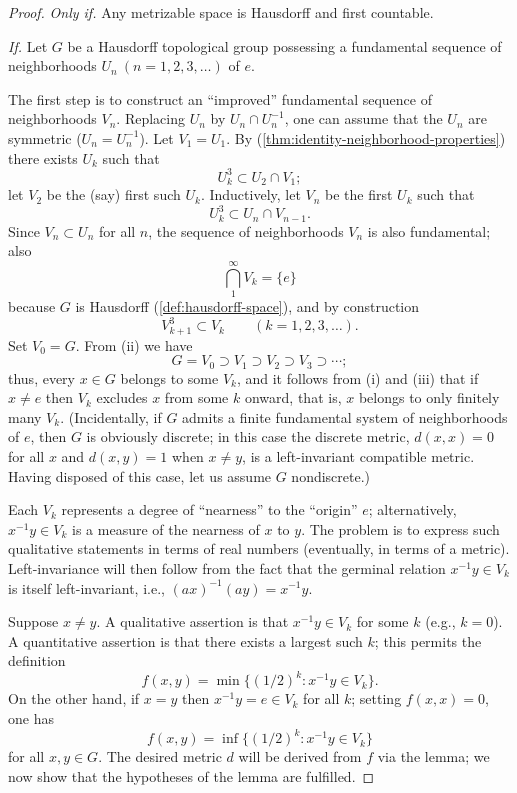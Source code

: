\begin{proof}
    \textit{Only if.} Any metrizable space is Hausdorff and first countable.

    \textit{If.} Let $G$ be a Hausdorff topological group possessing a fundamental sequence of neighborhoods $U_n \ (n = 1,2,3,\dots)$ of $e$.

    The first step is to construct an “improved” fundamental sequence of neighborhoods $V_n$. Replacing $U_n$ by $U_n \cap U_n^{-1}$, one can assume that the $U_n$ are symmetric ($U_n = U_n^{-1}$). Let $V_1 = U_1$. By (\ref{thm:identity-neighborhood-properties}) there exists $U_k$ such that
    \[
        U_k^3 \subset U_2 \cap V_1;
    \]
    let $V_2$ be the (say) first such $U_k$. Inductively, let $V_n$ be the first $U_k$ such that
    \[
        U_k^3 \subset U_n \cap V_{n-1}.
    \]
    Since $V_n \subset U_n$ for all $n$, the sequence of neighborhoods $V_n$ is also fundamental; also
    \begin{equation}
        \bigcap_{1}^{\infty} V_k = \{e\}
    \end{equation}
    because $G$ is Hausdorff (\ref{def:hausdorff-space}), and by construction
    \begin{equation}
        V_{k+1}^3 \subset V_k \qquad (k = 1,2,3,\dots).
    \end{equation}
    Set $V_0 = G$. From (ii) we have
    \begin{equation}
        G = V_0 \supset V_1 \supset V_2 \supset V_3 \supset \cdots;
    \end{equation}
    thus, every $x \in G$ belongs to some $V_k$, and it follows from (i) and (iii) that if $x \neq e$ then $V_k$ excludes $x$ from some $k$ onward, that is, $x$ belongs to only finitely many $V_k$. (Incidentally, if $G$ admits a finite fundamental system of neighborhoods of $e$, then $G$ is obviously discrete; in this case the discrete metric, $d(x,x) = 0$ for all $x$ and $d(x,y) = 1$ when $x \neq y$, is a left-invariant compatible metric. Having disposed of this case, let us assume $G$ nondiscrete.)

    Each $V_k$ represents a degree of “nearness” to the “origin” $e$; alternatively, $x^{-1}y \in V_k$ is a measure of the nearness of $x$ to $y$. The problem is to express such qualitative statements in terms of real numbers (eventually, in terms of a metric). Left-invariance will then follow from the fact that the germinal relation $x^{-1}y \in V_k$ is itself left-invariant, i.e., $(ax)^{-1}(ay) = x^{-1}y$.

    Suppose $x \neq y$. A qualitative assertion is that $x^{-1}y \in V_k$ for some $k$ (e.g., $k=0$). A quantitative assertion is that there exists a largest such $k$; this permits the definition
    \[
        f(x,y) = \min \{ (1/2)^k : x^{-1}y \in V_k \}.
    \]
    On the other hand, if $x = y$ then $x^{-1}y = e \in V_k$ for all $k$; setting $f(x,x) = 0$, one has
    \begin{equation}
        f(x,y) = \inf \{ (1/2)^k : x^{-1}y \in V_k \}
    \end{equation}
    for all $x,y \in G$. The desired metric $d$ will be derived from $f$ via the lemma; we now show that the hypotheses of the lemma are fulfilled.


\end{proof}
